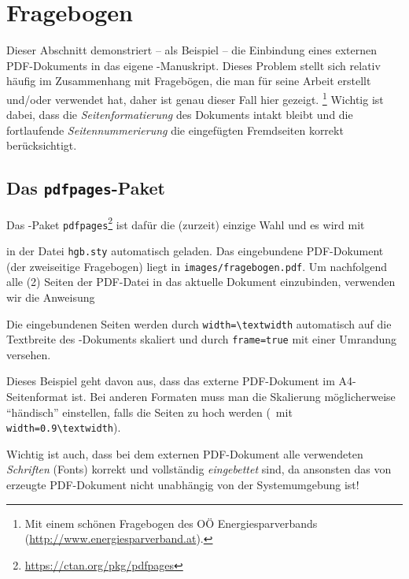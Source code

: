 \chapter{Fragebogen}
\label{app:Fragebogen}


Dieser Abschnitt demonstriert -- als Beispiel -- die Einbindung eines externen PDF-Dokuments
in das eigene \latex-Manuskript.
Dieses Problem stellt sich relativ häufig im Zusammenhang mit Fragebögen, die
man für seine Arbeit erstellt und/oder verwendet hat, daher ist genau dieser Fall hier gezeigt.%
\footnote{Mit einem schönen Fragebogen des OÖ Energiesparverbands (\url{http://www.energiesparverband.at}).}
Wichtig ist dabei, dass die \emph{Seitenformatierung} des Dokuments intakt bleibt 
und die fortlaufende \emph{Seitennummerierung} die eingefügten Fremdseiten korrekt berücksichtigt.

\section{Das \texttt{pdfpages}-Paket}

Das \latex-Paket \texttt{pdfpages}\footnote{\url{https://ctan.org/pkg/pdfpages}}
ist dafür die (zurzeit) einzige Wahl und es wird mit 
%
\begin{LaTeXCode}[numbers=none]
\RequirePackage{pdfpages}
\end{LaTeXCode}
%
in der Datei \nolinkurl{hgb.sty} automatisch geladen.
Das eingebundene PDF-Dokument (der zweiseitige Frage\-bogen) liegt in
\nolinkurl{images/fragebogen.pdf}.
Um nachfolgend alle (2) Seiten der PDF-Datei in das aktuelle Dokument einzubinden,
verwenden wir die Anweisung  
%
\begin{LaTeXCode}[numbers=none]

\end{LaTeXCode}
%
Die eingebundenen Seiten werden durch \verb!width=\textwidth! automatisch auf die Textbreite
des \latex-Dokuments skaliert und durch \verb!frame=true! mit einer Umrandung versehen.

Dieses Beispiel geht davon aus, dass das externe PDF-Dokument im A4-Seitenformat ist.
Bei anderen Formaten muss man die Skalierung möglicherweise "`händisch"' einstellen,
falls die Seiten zu hoch werden (\zB\ mit \verb!width=0.9\textwidth!).

Wichtig ist auch, dass bei dem externen PDF-Dokument alle verwendeten \emph{Schriften}
(Fonts) korrekt und vollständig \emph{eingebettet} sind, da ansonsten das von \latex erzeugte 
PDF-Dokument nicht unabhängig von der Systemumgebung ist!


